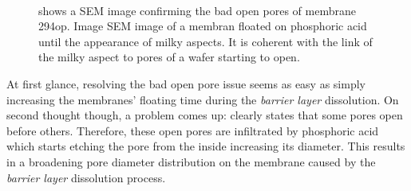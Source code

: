 \documentclass[../thesis.tex]{subfiles}
\begin{document}
        \begin{figure}[p]
          \centering
            \\
          \caption{\protect{} shows a SEM image confirming the bad open pores of membrane 294op. Image \protect{} SEM image of a membran floated on phosphoric acid until the appearance of milky aspects. It is coherent with the link of the milky aspect to pores of a wafer starting to open.}
        \end{figure}

        At first glance, resolving the bad open pore issue seems as easy as simply increasing the membranes' floating time during the \textit{barrier layer} dissolution. On second thought though, a problem comes up:  clearly states that some pores open before others. Therefore, these open pores are infiltrated by phosphoric acid which starts etching the pore from the inside increasing its diameter. This results in a broadening pore diameter distribution on the membrane caused by the \textit{barrier layer} dissolution process.
\end{document}
